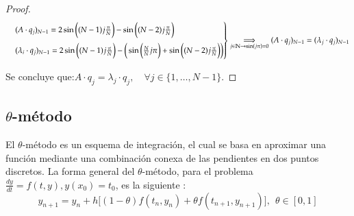 \documentclass{endm}
\begin{document}
\begin{proof}
\begin{equation*}
   \begin{rcases}
    & (A\cdot q_{j})_{N-1}  = 2 \sin{\bigg((N-1)j\frac{\pi}{N}\bigg)} -
    \sin{\bigg((N-2)j\frac{\pi}{N}\bigg)} \\
    & (\lambda_{i}\cdot q_{j})_{N-1} = 2 \sin{\bigg((N-1)j\frac{\pi}{N}\bigg)} - 
    \bigg( \sin{\bigg(\frac{N}{N}j \pi \bigg)} + \sin{\bigg((N-2)j\frac{\pi}{N}\bigg)}
    \bigg)
   \end{rcases} \underset{j\in \mathbb{N} \rightarrow \sin(j\pi)=0 }{\Longrightarrow}
   (A\cdot q_{j})_{N-1} = (\lambda_{j}\cdot q_{j})_{N-1} 
\end{equation*}

Se concluye que:\quad $ A\cdot q_{j} = \lambda_{j}\cdot q_{j},\quad \forall j \in \{1,\dots, N-1\} $. \end{proof}


\subsection{\texorpdfstring{$\theta$-m\'etodo}{Theta-metodo}}

El $\theta$-m\'etodo es un esquema de integraci\'on, el cual se basa en aproximar una funci\'on mediante una combinaci\'on conexa de las pendientes en dos puntos discretos. La forma general del $\theta$-m\'etodo, para el problema $\frac{dy}{dt}=f(t,y), y(x_0)=t_0$, es la siguiente \cite[p.36]{slidetheta}:
\begin{equation} \label{thetageneral}
    y_{n+1} = y_n + h\bigg[ (1-\theta)f(t_n,y_n)+\theta f(t_{n+1},y_{n+1})\bigg], \ \ \theta \in [0,1]
\end{equation}
\end{document}
